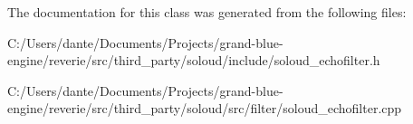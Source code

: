 The documentation for this class was generated from the following files\+:\begin{DoxyCompactItemize}
\item 
C\+:/\+Users/dante/\+Documents/\+Projects/grand-\/blue-\/engine/reverie/src/third\+\_\+party/soloud/include/soloud\+\_\+echofilter.\+h\item 
C\+:/\+Users/dante/\+Documents/\+Projects/grand-\/blue-\/engine/reverie/src/third\+\_\+party/soloud/src/filter/soloud\+\_\+echofilter.\+cpp\end{DoxyCompactItemize}
